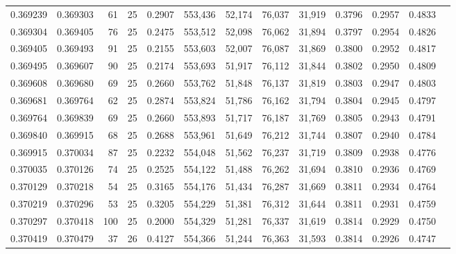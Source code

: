 \begin{tabular}{rrrrrrrrrrrrr}
0.369239 & 0.369303 &    61 &  25 &                                     0.2907 & 553,436 &  52,174 &  76,037 &  31,919 & 0.3796 & 0.2957 & 0.4833 \\
0.369304 & 0.369405 &    76 &  25 &                                     0.2475 & 553,512 &  52,098 &  76,062 &  31,894 & 0.3797 & 0.2954 & 0.4826 \\
0.369405 & 0.369493 &    91 &  25 &                                     0.2155 & 553,603 &  52,007 &  76,087 &  31,869 & 0.3800 & 0.2952 & 0.4817 \\
0.369495 & 0.369607 &    90 &  25 &                                     0.2174 & 553,693 &  51,917 &  76,112 &  31,844 & 0.3802 & 0.2950 & 0.4809 \\
0.369608 & 0.369680 &    69 &  25 &                                     0.2660 & 553,762 &  51,848 &  76,137 &  31,819 & 0.3803 & 0.2947 & 0.4803 \\
0.369681 & 0.369764 &    62 &  25 &                                     0.2874 & 553,824 &  51,786 &  76,162 &  31,794 & 0.3804 & 0.2945 & 0.4797 \\
0.369764 & 0.369839 &    69 &  25 &                                     0.2660 & 553,893 &  51,717 &  76,187 &  31,769 & 0.3805 & 0.2943 & 0.4791 \\
0.369840 & 0.369915 &    68 &  25 &                                     0.2688 & 553,961 &  51,649 &  76,212 &  31,744 & 0.3807 & 0.2940 & 0.4784 \\
0.369915 & 0.370034 &    87 &  25 &                                     0.2232 & 554,048 &  51,562 &  76,237 &  31,719 & 0.3809 & 0.2938 & 0.4776 \\
0.370035 & 0.370126 &    74 &  25 &                                     0.2525 & 554,122 &  51,488 &  76,262 &  31,694 & 0.3810 & 0.2936 & 0.4769 \\
0.370129 & 0.370218 &    54 &  25 &                                     0.3165 & 554,176 &  51,434 &  76,287 &  31,669 & 0.3811 & 0.2934 & 0.4764 \\
0.370219 & 0.370296 &    53 &  25 &                                     0.3205 & 554,229 &  51,381 &  76,312 &  31,644 & 0.3811 & 0.2931 & 0.4759 \\
0.370297 & 0.370418 &   100 &  25 &                                     0.2000 & 554,329 &  51,281 &  76,337 &  31,619 & 0.3814 & 0.2929 & 0.4750 \\
0.370419 & 0.370479 &    37 &  26 &                                     0.4127 & 554,366 &  51,244 &  76,363 &  31,593 & 0.3814 & 0.2926 & 0.4747 \\

\end{tabular}
